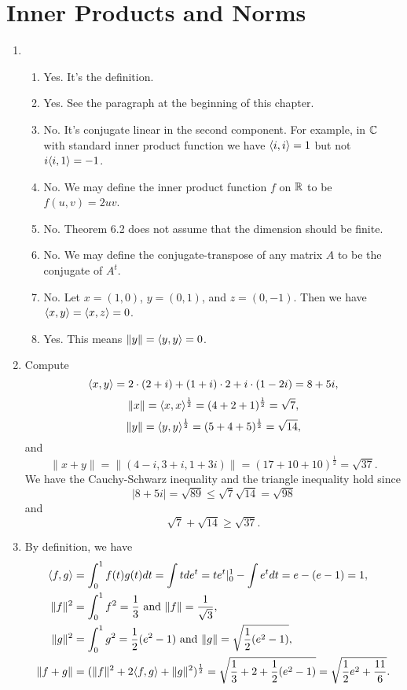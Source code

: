 \section{Inner Products and Norms}
\begin{enumerate}
\item \begin{enumerate}
\item Yes. It's the definition.
\item Yes. See the paragraph at the beginning of this chapter.
\item No. It's conjugate linear in the second component. For example, in $\mathbb{C}$ with standard inner product function we have $\langle i,i\rangle =1$ but not $i\langle i,1\rangle =-1$.
\item No. We may define the inner product function $f$ on $\mathbb{R}$ to be $f(u,v)=2uv$.
\item No. Theorem 6.2 does not assume that the dimension should be finite.
\item No. We may define the conjugate-transpose of any matrix $A$ to be the conjugate of $A^t$.
\item No. Let $x=(1,0)$, $y=(0,1)$, and $z=(0,-1)$. Then we have $\langle x,y\rangle =\langle x,z\rangle =0$.
\item Yes. This means $\|y\|=\langle y,y\rangle =0$.
\end{enumerate}
\item Compute 
\[\langle x,y\rangle =2\cdot (2+i)+(1+i)\cdot 2+i\cdot (1-2i)=8+5i,\] 
\[\|x\|=\langle x,x\rangle ^{\frac{1}{2}}=(4+2+1)^{\frac{1}{2}}=\sqrt{7},\]
\[\|y\|=\langle y,y\rangle ^{\frac{1}{2}}=(5+4+5)^{\frac{1}{2}}=\sqrt{14},\]
and 
\[\|x+y\|=\|(4-i,3+i,1+3i)\|=(17+10+10)^{\frac{1}{2}}=\sqrt{37}.\]
We have the Cauchy-Schwarz inequality and the triangle inequality hold since
\[|8+5i|=\sqrt{89}\leq \sqrt{7}\sqrt{14}=\sqrt{98}\]
and 
\[\sqrt{7}+\sqrt{14}\geq \sqrt{37}.\]
\item By definition, we have
\[\begin{aligned}
    \langle f,g\rangle &= \int_0^1{f(t)g(t)dt}=\int{tde^t}=te^t|_0^1-\int{e^tdt}=e-(e-1)=1, \\
    \|f\|^2 &= \int_0^1{f^2}=\frac{1}{3} \text{ and } \|f\| = \frac{1}{\sqrt{3}}, \\
    \|g\|^2 &= \int_0^1{g^2}=\frac{1}{2}(e^2-1) \text{ and } \|g\| = \sqrt{\frac{1}{2}(e^2-1)}, \\
    \|f+g\| &= (\|f\|^2+2\langle f,g\rangle +\|g\|^2)^{\frac{1}{2}} = \sqrt{\frac{1}{3} + 2 + \frac{1}{2}(e^2-1)} = \sqrt{\frac{1}{2}e^2 + \frac{11}{6}}.
\end{aligned}\]

\end{enumerate}
